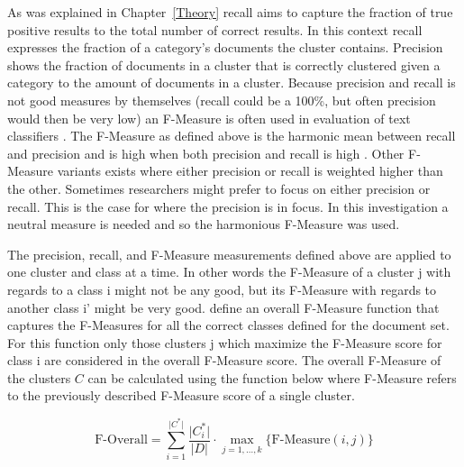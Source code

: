As was explained in Chapter~\ref{Theory} recall aims to capture the fraction of true positive results to the total number of correct results. In this context recall expresses the fraction of a category's documents the cluster contains. Precision shows the fraction of documents in a cluster that is correctly clustered given a category to the amount of documents in a cluster. Because precision and recall is not good measures by themselves (recall could be a 100\%, but often precision would then be very low) an F-Measure is often used in evaluation of text classifiers \cite{Baeza-Yates2011a}. The F-Measure as defined above is the harmonic mean between recall and precision and is high when both precision and recall is high \cite{Baeza-Yates2011b}. Other F-Measure variants exists where either precision or recall is weighted higher than the other. Sometimes researchers might prefer to focus on either precision or recall. This is the case for \cite{Moe2013compact} where the precision is in focus. In this investigation a neutral measure is needed and so the harmonious F-Measure was used. 

The precision, recall, and F-Measure measurements defined above are applied to one cluster and class at a time. In other words the F-Measure of a cluster j with regards to a class i might not be any good, but its F-Measure with regards to another class i' might be very good. \cite{Chim2007} define an overall F-Measure function that captures the F-Measures for all the correct classes defined for the document set. For this function only those clusters j which maximize the F-Measure score for class i are considered in the overall F-Measure score. The overall F-Measure of the clusters \(C\) can be calculated using the function below where F-Measure refers to the previously described F-Measure score of a single cluster.

\begin{displaymath}
\text{F-Overall} = \sum_{i=1}^{\vert C^* \vert} \frac{\vert C_i^* \vert}{\vert D \vert} \cdot \max_{j=1,\dots,k} \{\text{F-Measure}(i,j)\}
\end{displaymath}

